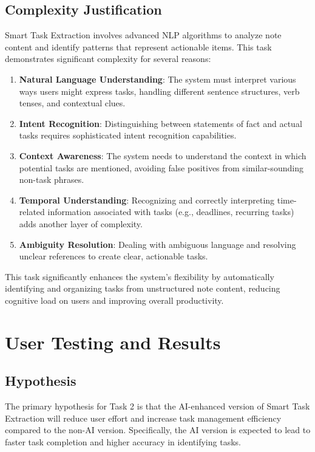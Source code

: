 \documentclass[a4paper, 12pt]{article}
\begin{document}
\subsection{Complexity Justification}
Smart Task Extraction involves advanced NLP algorithms to analyze note content and identify patterns that represent actionable items. This task demonstrates significant complexity for several reasons:

\begin{enumerate}
    \item \textbf{Natural Language Understanding}: The system must interpret various ways users might express tasks, handling different sentence structures, verb tenses, and contextual clues.
    \item \textbf{Intent Recognition}: Distinguishing between statements of fact and actual tasks requires sophisticated intent recognition capabilities.
    \item \textbf{Context Awareness}: The system needs to understand the context in which potential tasks are mentioned, avoiding false positives from similar-sounding non-task phrases.
    \item \textbf{Temporal Understanding}: Recognizing and correctly interpreting time-related information associated with tasks (e.g., deadlines, recurring tasks) adds another layer of complexity.
    \item \textbf{Ambiguity Resolution}: Dealing with ambiguous language and resolving unclear references to create clear, actionable tasks.
\end{enumerate}

This task significantly enhances the system's flexibility by automatically identifying and organizing tasks from unstructured note content, reducing cognitive load on users and improving overall productivity.

\section{User Testing and Results}
\subsection{Hypothesis}
The primary hypothesis for Task 2 is that the AI-enhanced version of Smart Task Extraction will reduce user effort and increase task management efficiency compared to the non-AI version. Specifically, the AI version is expected to lead to faster task completion and higher accuracy in identifying tasks.
\end{document}
